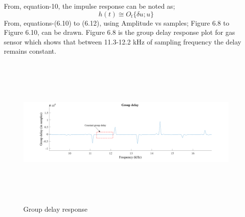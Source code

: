 From, equation-10, the impulse response can be noted as;
\begin{equation}\tag{6.12}
h ( t ) \cong O_{t} \{  \delta u; u \}
\end{equation}
From, equations-(6.10) to (6.12), using Amplitude vs samples; Figure 6.8 to Figure 6.10, can be drawn. Figure 6.8 is the group delay response plot for gas sensor which shows that between 11.3-12.2 kHz of sampling frequency the delay remains constant.
\begin{figure}[H]
	\begin{Center}
		\includegraphics[width=6.5in,height=3in]{22}
		\caption{Group delay response}
		\label{fig:_8_Group_delay_response}
	\end{Center}
\end{figure}

